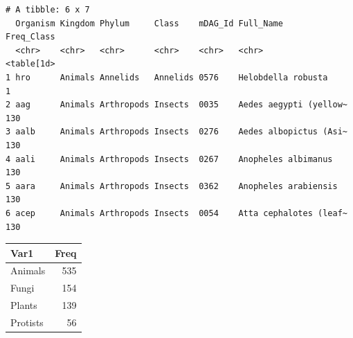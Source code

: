 \documentclass[
  letterpaper,
  DIV=11,
  numbers=noendperiod]{scrreprt}
\newenvironment{Shaded}{\begin{snugshade}}{\end{snugshade}}
\newcommand{\AttributeTok}[1]{\textcolor[rgb]{0.40,0.45,0.13}{#1}}
\newcommand{\FunctionTok}[1]{\textcolor[rgb]{0.28,0.35,0.67}{#1}}
\newcommand{\NormalTok}[1]{\textcolor[rgb]{0.00,0.23,0.31}{#1}}
\newcommand{\SpecialCharTok}[1]{\textcolor[rgb]{0.37,0.37,0.37}{#1}}
\newcommand{\StringTok}[1]{\textcolor[rgb]{0.13,0.47,0.30}{#1}}
\begin{document}
\begin{verbatim}
# A tibble: 6 x 7
  Organism Kingdom Phylum     Class    mDAG_Id Full_Name              Freq_Class
  <chr>    <chr>   <chr>      <chr>    <chr>   <chr>                  <table[1d>
1 hro      Animals Annelids   Annelids 0576    Helobdella robusta       1       
2 aag      Animals Arthropods Insects  0035    Aedes aegypti (yellow~ 130       
3 aalb     Animals Arthropods Insects  0276    Aedes albopictus (Asi~ 130       
4 aali     Animals Arthropods Insects  0267    Anopheles albimanus    130       
5 aara     Animals Arthropods Insects  0362    Anopheles arabiensis   130       
6 acep     Animals Arthropods Insects  0054    Atta cephalotes (leaf~ 130       
\end{verbatim}

\begin{Shaded}
\end{Shaded}

\begin{tabular}{l|r}
\hline
Var1 & Freq\\
\hline
Animals & 535\\
\hline
Fungi & 154\\
\hline
Plants & 139\\
\hline
Protists & 56\\
\hline
\end{tabular}

\begin{Shaded}
\end{Shaded}
\end{document}
